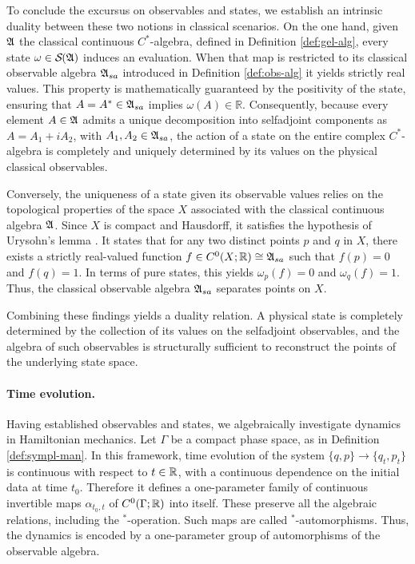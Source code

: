 	To conclude the excursus on observables and states, we establish an intrinsic duality between these two notions in classical scenarios. On the one hand, given $\mathfrak{A}$ the classical continuous $C^*$-algebra, defined in Definition \ref{def:gel-alg}, every state $\omega \in \mathcal{S}(\A)$ induces an evaluation. When that map is restricted to its classical observable algebra $\mathfrak{A}_{sa}$ introduced in Definition \ref{def:obs-alg} it yields strictly real values. This property is mathematically guaranteed by the positivity of the state, ensuring that $A = A^* \in \mathfrak{A}_{sa}$ implies $\omega(A) \in \mathbb{R}$. Consequently, because every element $A \in \mathfrak{A}$ admits a unique decomposition into selfadjoint components as $A = A_1 + iA_2$, with $A_1, A_2 \in \mathfrak{A}_{sa}$, the action of a state on the entire complex $C^*$-algebra is completely and uniquely determined by its values on the physical classical observables. 
	
	Conversely, the uniqueness of a state given its observable values relies on the topological properties of the space $X$ associated with the classical continuous algebra $\mathfrak{A}$. Since $X$ is compact and Hausdorff, it satisfies the hypothesis of Urysohn's lemma \cite[Theorem IV.7]{reedMethodsModernMathematical2003}. It states that for any two distinct points $p$ and $q$ in $X$, there exists a strictly real-valued function $f \in C^0(X; \mathbb{R}) \cong \mathfrak{A}_{sa}$ such that $f(p)=0$ and $f(q)=1$. In terms of pure states, this yields $\omega_p(f)=0$ and $\omega_q(f)=1$. Thus, the classical observable algebra $\mathfrak{A}_{sa}$ separates points on $X$. 
	
	Combining these findings yields a duality relation. A physical state is completely determined by the collection of its values on the selfadjoint observables, and the algebra of such observables is structurally sufficient to reconstruct the points of the underlying state space.
	\medskip
	\paragraph{Time evolution.}
	Having established observables and states, we algebraically investigate dynamics in Hamiltonian mechanics. Let $\Gamma$ be a compact phase space, as in Definition \ref{def:sympl-man}. In this framework, time evolution of the system $\{q, p\} \to \{q_t, p_t\}$ is continuous with respect to $t \in \mathbb{R}$, with a continuous dependence on the initial data at time $t_0$. Therefore it defines a one-parameter family of continuous invertible maps $\alpha_{t_0, t}$ of $C^0(\Gamma; \mathbb{R})$ into itself. These preserve all the algebraic relations, including the $^*$-operation. Such maps are called $^*$-automorphisms. Thus, the dynamics is encoded by a one-parameter group of automorphisms of the observable algebra.
	
